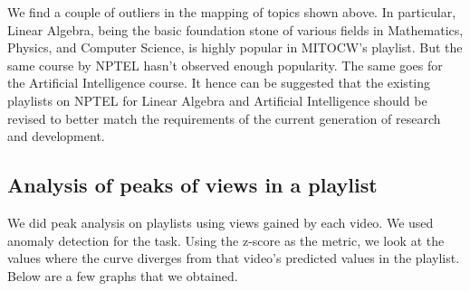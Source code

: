 \documentclass{article}
\begin{document}
\noindent We find a couple of outliers in the mapping of topics shown above. In particular, Linear Algebra, being the basic foundation stone of various fields in Mathematics, Physics, and Computer Science, is highly popular in MITOCW's playlist. But the same course by NPTEL hasn't observed enough popularity. The same goes for the Artificial Intelligence course. It hence can be suggested that the existing playlists on NPTEL for Linear Algebra and Artificial Intelligence should be revised to better match the requirements of the current generation of research and development.\\


\subsection{Analysis of peaks of views in a playlist}
We did peak analysis on playlists using views gained by each video. We used anomaly detection for the task. Using the z-score as the metric, we look at the values where the curve diverges from that video's predicted values in the playlist. Below are a few graphs that we obtained. 
\end{document}
